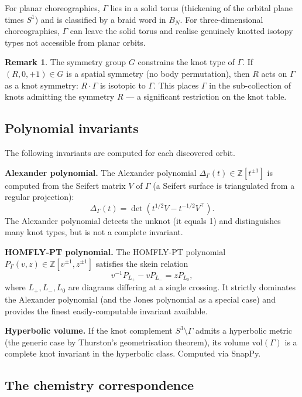 \documentclass[12pt, a4paper]{article}
\theoremstyle{plain}
\theoremstyle{definition}
\newtheorem{remark}[theorem]{Remark}
\newcommand{\Z}{\mathbb{Z}}
\begin{document}
For planar choreographies, $\Gamma$ lies in a solid torus
(thickening of the orbital plane times $S^1$) and is classified by
a braid word in $B_N$.  For three-dimensional choreographies,
$\Gamma$ can leave the solid torus and realise genuinely knotted
isotopy types not accessible from planar orbits.

\begin{remark}
The symmetry group $G$ constrains the knot type of $\Gamma$.  If
$(R, 0, +1) \in G$ is a spatial symmetry (no body permutation),
then $R$ acts on $\Gamma$ as a knot symmetry: $R \cdot \Gamma$ is
isotopic to $\Gamma$.  This places $\Gamma$ in the sub-collection of
knots admitting the symmetry $R$ — a significant restriction on
the knot table.
\end{remark}

\subsection{Polynomial invariants}

The following invariants are computed for each discovered orbit.

\textbf{Alexander polynomial.}  The Alexander polynomial
$\Delta_\Gamma(t) \in \Z[t^{\pm 1}]$ is computed from the Seifert
matrix $V$ of $\Gamma$ (a Seifert surface is triangulated from a
regular projection):
\[
  \Delta_\Gamma(t) = \det\!\left(t^{1/2}V - t^{-1/2}V^\top\right).
\]
The Alexander polynomial detects the unknot (it equals 1) and
distinguishes many knot types, but is not a complete invariant.

\textbf{HOMFLY-PT polynomial.}  The HOMFLY-PT polynomial
$P_\Gamma(v, z) \in \Z[v^{\pm 1}, z^{\pm 1}]$ satisfies the skein
relation
\[
  v^{-1}P_{L_+} - vP_{L_-} = z P_{L_0},
\]
where $L_+, L_-, L_0$ are diagrams differing at a single crossing.
It strictly dominates the Alexander polynomial (and the Jones
polynomial as a special case) and provides the finest easily-computable
invariant available.

\textbf{Hyperbolic volume.}  If the knot complement
$S^3 \setminus \Gamma$ admits a hyperbolic metric (the generic case by
Thurston's geometrisation theorem), its volume $\mathrm{vol}(\Gamma)$
is a complete knot invariant in the hyperbolic class.  Computed via SnapPy.

\subsection{The chemistry correspondence}
\end{document}

